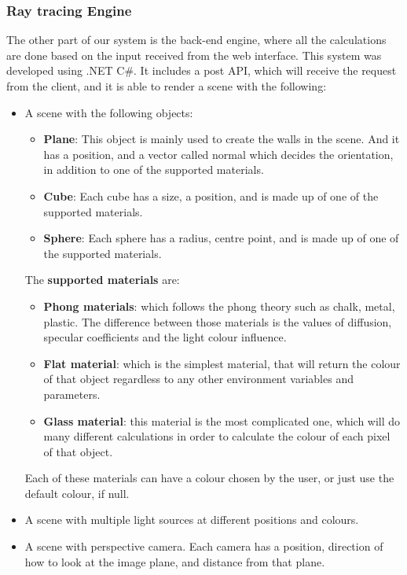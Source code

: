 \documentclass[a4paper]{article}
\begin{document}
	\subsubsection{Ray tracing Engine}
	The other part of our system is the back-end engine, where all the calculations are done based on the input received from the web interface. This system was developed using .NET C\#. It includes a post API, which will receive the request from the client, and it is able to render a scene with the following:
	\begin{itemize}
		\item A scene with the following objects:
		\begin{itemize}
			\item \textbf{Plane}: This object is mainly used to create the walls in the scene. And it has a position, and a vector called normal which decides the orientation, in addition to one of the supported materials.
			\item \textbf{Cube}: Each cube has a size, a position, and is made up of one of the supported materials.
			\item \textbf{Sphere}: Each sphere has a radius, centre point, and is made up of one of the supported materials.
		\end{itemize}
		The  \textbf{supported materials} are:
		\begin{itemize}
			\item \textbf{Phong materials}:  which follows the phong theory such as chalk, metal, plastic. The difference between those materials is the values of diffusion, specular coefficients and the light colour influence.
			\item \textbf{Flat material}: which is the simplest material, that will return the colour of that object regardless to any other environment variables and parameters.
			\item \textbf {Glass material}: this material is the most complicated one, which will do many different calculations in order to calculate the colour of each pixel of that object.
		\end{itemize}
		Each of these materials can have a colour chosen by the user, or just use the default colour, if null.
		\item A scene with multiple light sources at different positions and colours.
		\item A scene with perspective camera. Each camera has a position, direction of how to look at the image plane, and distance from that plane.
	\end{itemize}
\end{document}

